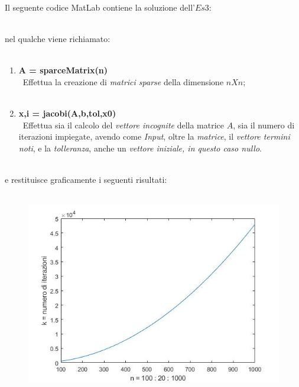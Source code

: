 Il seguente codice MatLab contiene la soluzione dell'$Es 3$:\\\
	
nel qualche viene richiamato:\\\
	\begin{enumerate}
		\item \textbf{A = sparceMatrix(n)}\\\
			Effettua la creazione di \textit{matrici sparse} della dimensione $nXn$;\\\
		\item \textbf{x,i = jacobi(A,b,tol,x0)}\\\
			Effettua sia il calcolo del \textit{vettore incognite} della matrice $A$, sia il numero di iterazioni impiegate, avendo come \textit{Input}, oltre la 	\textit{matrice}, il \textit{vettore termini noti}, e la \textit{tolleranza}, anche un \textit{vettore iniziale, in questo caso nullo}.\\\
			
	\end{enumerate}
e restituisce graficamente i seguenti risultati:\\\
	\begin{figure}[H]
		\includegraphics[width=\textwidth]{Plot/Cap_6_Es_3}
	\end{figure}